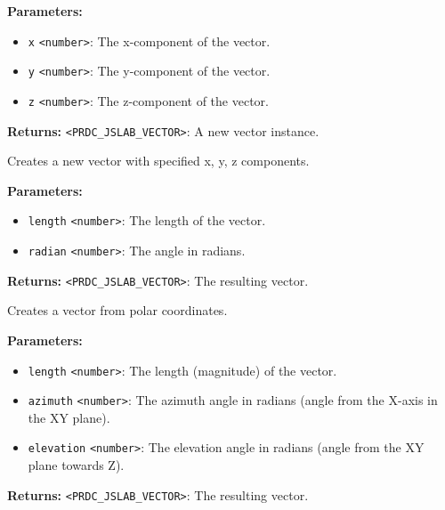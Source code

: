 \documentclass[12pt,a4paper]{article}
\begin{document}
\noindent \textbf{Parameters:}
\begin{itemize}
  \item \texttt{x} \texttt{<number>}: The x-component of the vector.
  \item \texttt{y} \texttt{<number>}: The y-component of the vector.
  \item \texttt{z} \texttt{<number>}: The z-component of the vector.
\end{itemize}

\noindent \textbf{Returns:} \texttt{<PRDC\_JSLAB\_VECTOR>}: A new vector instance.

\noindent Creates a new vector with specified x, y, z components.

\vspace{5mm}
\noindent {}


\noindent \textbf{Parameters:}
\begin{itemize}
  \item \texttt{length} \texttt{<number>}: The length of the vector.
  \item \texttt{radian} \texttt{<number>}: The angle in radians.
\end{itemize}

\noindent \textbf{Returns:} \texttt{<PRDC\_JSLAB\_VECTOR>}: The resulting vector.

\noindent Creates a vector from polar coordinates.

\vspace{5mm}
\noindent {}


\noindent \textbf{Parameters:}
\begin{itemize}
  \item \texttt{length} \texttt{<number>}: The length (magnitude) of the vector.
  \item \texttt{azimuth} \texttt{<number>}: The azimuth angle in radians (angle from the X-axis in the XY plane).
  \item \texttt{elevation} \texttt{<number>}: The elevation angle in radians (angle from the XY plane towards Z).
\end{itemize}

\noindent \textbf{Returns:} \texttt{<PRDC\_JSLAB\_VECTOR>}: The resulting vector.
\end{document}
